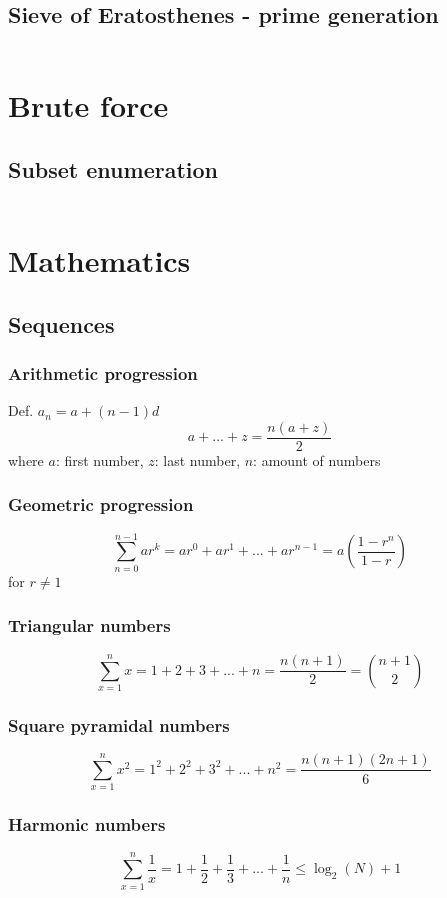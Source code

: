 \documentclass[8pt,a4paper,landscape,oneside]{amsart}
\newcommand{\code}[1]{\inputminted[fontsize=\normalsize,baselinestretch=1]{python}{code/#1}}
\begin{document}
\begin{multicols*}{3}
    \subsection{Sieve of Eratosthenes - prime generation}
        \code{helloworld.py}

\section{Brute force}

    \subsection{Subset enumeration}
        \code{helloworld.py}

\section{Mathematics}

    \subsection{Sequences}
        \subsubsection{Arithmetic progression}
            Def. $a_n = a + (n-1)d$
            $$ a + ... + z = \frac{n(a+z)}{2}$$
            where $a$: first number, $z$: last number, $n$: amount of numbers
        \subsubsection{Geometric progression}
            $$\sum_{n=0}^{n-1}{ar^k} = ar^0 + ar^1 + ... + ar^{n-1} = a\left(\frac{1-r^n}{1-r}\right)$$
            for $r \neq 1$
        \subsubsection{Triangular numbers}
            $$\sum_{x=1}^{n}{x} = 1 + 2 + 3 + ... + n = \frac{n(n+1)}{2} = \binom{n+1}{2}$$
        \subsubsection{Square pyramidal numbers}
            $$\sum_{x=1}^{n}{x^2} = 1^2 + 2^2 + 3^2 + ... + n^2 = \frac{n(n+1)(2n+1)}{6}$$
        \subsubsection{Harmonic numbers}
            $$\sum_{x=1}^{n}{\frac{1}{x}} = 1 + \frac{1}{2} + \frac{1}{3} + ... + \frac{1}{n} \leq \log_2(N) + 1$$

\end{multicols*}
\end{document}
